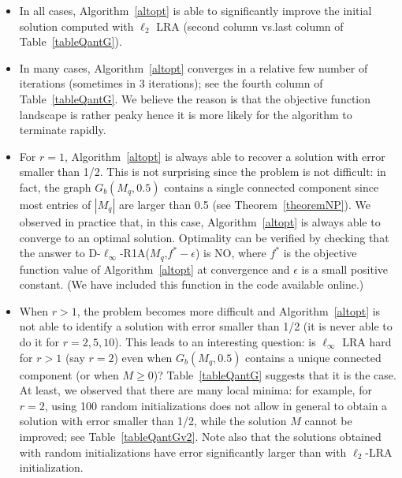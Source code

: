\documentclass[a4paper,11pt]{article}
\numberwithin{equation}{section}
\begin{document}
\begin{itemize}

\item In all cases, Algorithm~\ref{altopt} is able to significantly improve the initial solution computed with $\ell_2$ LRA (second column vs.\@ last column of Table~\ref{tableQantG}). 

\item In many cases, Algorithm~\ref{altopt} converges in a relative few number of iterations (sometimes in 3 iterations); see the fourth column of Table~\ref{tableQantG}. We believe the reason is that the objective function landscape is rather peaky hence it is more likely for the algorithm to terminate rapidly.  

\item For $r=1$, Algorithm~\ref{altopt} is always able to recover a solution with error smaller than 1/2. 
This is not surprising since the problem is not difficult: in fact, the graph $G_b(M_q,0.5)$ contains a single connected component since most entries of $|M_q|$ are larger than 0.5 (see Theorem~\ref{theoremNP}). 
We observed in practice that, in this case, Algorithm~\ref{altopt} is always able to converge to an optimal solution. Optimality can be verified by checking that the answer to D-$\ell_\infty$-R1A($M_q$,$f^*-\epsilon$) is NO, where $f^*$ is the objective function value of Algorithm~\ref{altopt} at convergence and $\epsilon$ is a small positive constant. (We have included this function in the code available online.) 

\item When $r > 1$, the problem becomes more difficult and Algorithm~\ref{altopt} is not able to identify a solution with error smaller than 1/2 (it is never able to do it for $r=2,5,10$). This leads to an interesting question: 
is $\ell_{\infty}$ LRA hard for $r > 1$ (say $r=2$) even when $G_b(M_q,0.5)$ contains a unique connected component (or when $M \geq 0$)? 
Table~\ref{tableQantG} suggests that it is the case. At least, we observed that there are many local minima: for example, for $r=2$, using 100 random initializations does not allow in general to obtain a solution with error smaller than 1/2, while the solution $M$ cannot be improved; see Table~\ref{tableQantGv2}.  
Note also that the solutions obtained with random initializations have error significantly larger than with $\ell_2$-LRA initialization. 


\end{itemize}
\end{document}
